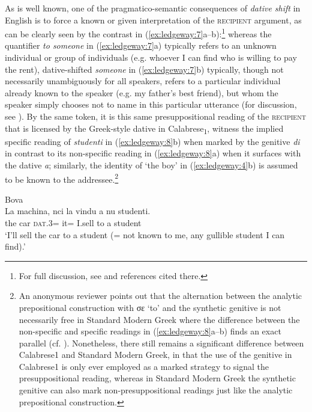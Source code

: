 \documentclass[output=paper,modfonts,nonflat,colorlinks,citecolor=brown]{langsci/langscibook}
\begin{document}
As is well known, one of the pragmatico-semantic consequences of \textit{dative shift} in English is to force a known or given interpretation of the \textsc{recipient} argument, as can be clearly seen by the contrast in (\ref{ex:ledgeway:7}a--b):\footnote{For full discussion, see \citet{Larson1988, Larson1990,Jackendoff1990larson,Torrego1998} and references cited there.} whereas the quantifier \textit{to someone} in (\ref{ex:ledgeway:7}a) typically refers to an unknown individual or group of individuals (e.g. whoever I can find who is willing to pay the rent), dative-shifted \textit{someone} in (\ref{ex:ledgeway:7}b) typically, though not necessarily unambiguously for all speakers, refers to a particular individual already known to the speaker (e.g. my father’s best friend), but whom the speaker simply chooses not to name in this particular utterance (for discussion, see \citealt{AounLi1993}). By the same token, it is this same presuppositional reading of the \textsc{recipient} that is licensed by the Greek-style dative in Calabrese\textsubscript{1}, witness the implied specific reading of \textit{studenti} in (\ref{ex:ledgeway:8}b) when marked by the genitive \textit{di} in contrast to its non-specific reading in (\ref{ex:ledgeway:8}a) when it surfaces with the dative \textit{a}; similarly, the identity of `the boy' in (\ref{ex:ledgeway:4}b) is assumed to be known to the addressee.\footnote{An anonymous reviewer points out that the alternation between the analytic prepositional construction with σε ‘to’ and the synthetic genitive is not necessarily free in Standard Modern Greek where the difference between the non-specific and specific readings in (\ref{ex:ledgeway:8}a--b) finds an exact parallel (cf. \citealt{Dimitriadis1999,Michelioudakis2012}). Nonetheless, there still remains a significant difference between Calabrese1 and Standard Modern Greek, in that the use of the genitive in Calabrese1 is only ever employed as a marked strategy to signal the presuppositional reading, whereas in Standard Modern Greek the synthetic genitive can also mark non-presuppositional readings just like the analytic prepositional construction.}

\ea\label{ex:ledgeway:8}
  Bova\\
\ea
	\gll La  machina,  nci  la  vindu  a  nu  studenti.\\
      the  car  \textsc{dat}.3=  it=  I.sell  to  a  student\\
      \glt `I’ll sell the car to a student (= not known to me, any gullible student I can find).'
\end{document}
